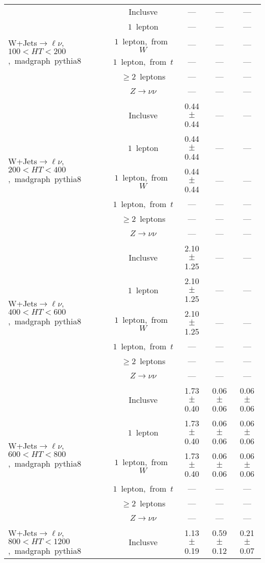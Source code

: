 \documentclass{article}
\begin{document}
\begin{longtable}{|l|c|c|c|c|}
\hline 
\multirow{6}{*}{W+Jets$\rightarrow\ell\nu$,~$100<HT<200$,~madgraph~pythia8} & Inclusve  & ---  & ---  & --- \\* 
 & $1$~lepton  & ---  & ---  & --- \\* 
 & $1$~lepton,~from~$W$  & ---  & ---  & --- \\* 
 & $1$~lepton,~from~$t$  & ---  & ---  & --- \\* 
 & $\ge2$~leptons  & ---  & ---  & --- \\* 
 & $Z\rightarrow\nu\nu$  & ---  & ---  & --- \\* 
\hline 
\multirow{6}{*}{W+Jets$\rightarrow\ell\nu$,~$200<HT<400$,~madgraph~pythia8} & Inclusve  & 0.44 $\pm$ 0.44  & ---  & --- \\* 
 & $1$~lepton  & 0.44 $\pm$ 0.44  & ---  & --- \\* 
 & $1$~lepton,~from~$W$  & 0.44 $\pm$ 0.44  & ---  & --- \\* 
 & $1$~lepton,~from~$t$  & ---  & ---  & --- \\* 
 & $\ge2$~leptons  & ---  & ---  & --- \\* 
 & $Z\rightarrow\nu\nu$  & ---  & ---  & --- \\* 
\hline 
\multirow{6}{*}{W+Jets$\rightarrow\ell\nu$,~$400<HT<600$,~madgraph~pythia8} & Inclusve  & 2.10 $\pm$ 1.25  & ---  & --- \\* 
 & $1$~lepton  & 2.10 $\pm$ 1.25  & ---  & --- \\* 
 & $1$~lepton,~from~$W$  & 2.10 $\pm$ 1.25  & ---  & --- \\* 
 & $1$~lepton,~from~$t$  & ---  & ---  & --- \\* 
 & $\ge2$~leptons  & ---  & ---  & --- \\* 
 & $Z\rightarrow\nu\nu$  & ---  & ---  & --- \\* 
\hline 
\multirow{6}{*}{W+Jets$\rightarrow\ell\nu$,~$600<HT<800$,~madgraph~pythia8} & Inclusve  & 1.73 $\pm$ 0.40  & 0.06 $\pm$ 0.06  & 0.06 $\pm$ 0.06 \\* 
 & $1$~lepton  & 1.73 $\pm$ 0.40  & 0.06 $\pm$ 0.06  & 0.06 $\pm$ 0.06 \\* 
 & $1$~lepton,~from~$W$  & 1.73 $\pm$ 0.40  & 0.06 $\pm$ 0.06  & 0.06 $\pm$ 0.06 \\* 
 & $1$~lepton,~from~$t$  & ---  & ---  & --- \\* 
 & $\ge2$~leptons  & ---  & ---  & --- \\* 
 & $Z\rightarrow\nu\nu$  & ---  & ---  & --- \\* 
\hline 
\multirow{6}{*}{W+Jets$\rightarrow\ell\nu$,~$800<HT<1200$,~madgraph~pythia8} & Inclusve  & 1.13 $\pm$ 0.19  & 0.59 $\pm$ 0.12  & 0.21 $\pm$ 0.07 \\* 

\end{longtable}
\end{document}

